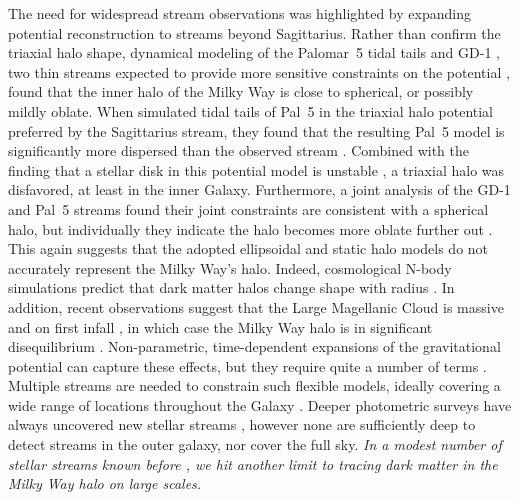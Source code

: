 \documentclass[final,5p,times,twocolumn,authoryear]{elsarticle}
\begin{document}
The need for widespread stream observations was highlighted by expanding potential reconstruction to streams beyond Sagittarius.
Rather than confirm the triaxial halo shape, dynamical modeling of the Palomar~5 tidal tails \citep[Pal~5;][]{kupper:2015} and GD-1 \citep{koposov:2010}, two thin streams expected to provide more sensitive constraints on the potential \citep{lux:2013}, found that the inner halo of the Milky Way is close to spherical, or possibly mildly oblate.
When \citet{pearson:2015} simulated tidal tails of Pal~5 in the triaxial halo potential preferred by the Sagittarius stream, they found that the resulting Pal~5 model is significantly more dispersed than the observed stream \citep{odenkirchen:2001, rockosi:2002}.
Combined with the finding that a stellar disk in this potential model is unstable \citep{debattista:2013}, a triaxial halo was disfavored, at least in the inner Galaxy.
Furthermore, a joint analysis of the GD-1 and Pal~5 streams found their joint constraints are consistent with a spherical halo, but individually they indicate the halo becomes more oblate further out \citep{bovy:2016}.
This again suggests that the adopted ellipsoidal and static halo models do not accurately represent the Milky Way's halo.
Indeed, cosmological N-body simulations predict that dark matter halos change shape with radius \citep[e.g.,][]{allgood:2006, bett:2007, maccio:2007, peter:2013, chua:2019}.
In addition, recent observations suggest that the Large Magellanic Cloud is massive and on first infall \citep[e.g.,][]{kallivayalil:2006, kallivayalil:2013, besla:2007, penarrubia:2016}, in which case the Milky Way halo is in significant disequilibrium \citep[e.g.,][]{bekki:2012, gomez:2015, garavito-camargo:2019}.
Non-parametric, time-dependent expansions of the gravitational potential can capture these effects, but they require quite a number of terms \citep[e.g.,][]{lowing:2011, lilley:2018, garavito-camargo:2021}.
Multiple streams are needed to constrain such flexible models, ideally covering a wide range of locations throughout the Galaxy \citep[e.g.,][]{bh:2018}.
Deeper photometric surveys have always uncovered new stellar streams \citep[e.g.,][]{koposov:2014, martin:2014, shipp:2018, jethwa:2018}, however none are sufficiently deep to detect streams in the outer galaxy, nor cover the full sky.
\emph{In a modest number of stellar streams known before \gaia, we hit another limit to tracing dark matter in the Milky Way halo on large scales.}
\end{document}
